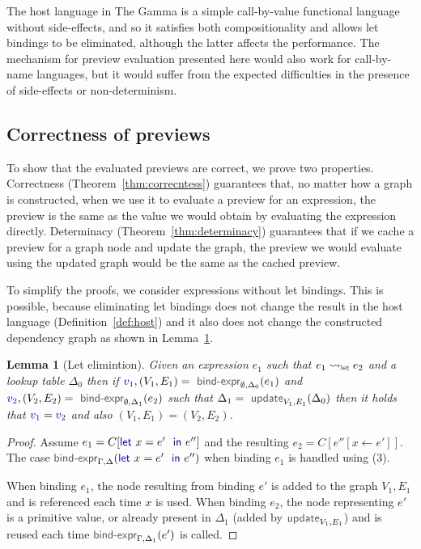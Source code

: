 \documentclass[acmsmall,anonymous,fleqn]{acmart}\settopmatter{printfolios=false,printccs=false,printacmref=false}
\newcounter{thc}
\theoremstyle{plain}
\newtheorem{lem}[thc]{Lemma}
\theoremstyle{definition}
\newcommand{\ident}[1]{\textnormal{\textcolor{idclr}{\sffamily #1}}}
\newcommand{\kvd}[1]{\textnormal{\textcolor{kvdclr}{\sffamily #1}}}
\newcommand{\bndclr}[1]{\textcolor{kvdclr}{#1}}
\begin{document}
\noindent
The host language in The Gamma is a simple call-by-value functional language without side-effects,
and so it satisfies both compositionality and allows let bindings to be eliminated, although the
latter affects the performance. The mechanism for preview evaluation presented here would also
work for call-by-name languages, but it would suffer from the expected difficulties in the
presence of side-effects or non-determinism.


\subsection{Correctness of previews}
\label{sec:properties-correct}

To show that the evaluated previews are correct, we prove two properties. Correctness
(Theorem~\ref{thm:correcntess}) guarantees that, no matter how a graph is constructed, when we use
it to evaluate a preview for an expression, the preview is the same as the value we would obtain
by evaluating the expression directly. Determinacy (Theorem~\ref{thm:determinacy}) guarantees that if
we cache a preview for a graph node and update the graph, the preview we would evaluate using the
updated graph would be the same as the cached preview.

To simplify the proofs, we consider expressions without let bindings. This is possible, because
eliminating let bindings does not change the result in the host language (Definition~\ref{def:host})
and it also does not change the constructed dependency graph as shown in Lemma~\ref{thm:let-elimination}.

\begin{lem}[Let elimintion]
\label{thm:let-elimination}
Given an expression $e_1$ such that $e_1 \rightsquigarrow_\ident{let} e_2$ and a lookup table $\Delta_0$
then if $\bndclr{v_1}, (V_1, E_1) = \ident{bind-expr}_{\emptyset, \Delta_0}(e_1)$ and
$\bndclr{v_2}, (V_2, E_2) = \ident{bind-expr}_{\emptyset, \Delta_1}(e_2)$ such that $\Delta_1 = \ident{update}_{V_1, E_1}(\Delta_0)$
then it holds that $\bndclr{v_1} = \bndclr{v_2}$ and also $(V_1, E_1) = (V_2, E_2)$.
\end{lem}
\begin{proof}
Assume $e_1 = C[\kvd{let}~x=e'~\kvd{in}~e'']$ and the resulting $e_2 = C[e''[x\leftarrow e']]$. The case
$\ident{bind-expr}_{\Gamma,\Delta}(\kvd{let}~x=e'~\kvd{in}~e'')$ when binding $e_1$ is handled using
(3).

When binding $e_1$, the node resulting from binding $e'$ is added to the graph $V_1, E_1$ and is
referenced each time $x$ is used. When binding $e_2$, the node representing $e'$ is a primitive value,
or already present in $\Delta_1$ (added by $\ident{update}_{V_1, E_1}$) and is reused each time
$\ident{bind-expr}_{\Gamma,\Delta_1}(e')$ is called.
\end{proof}
\end{document}
